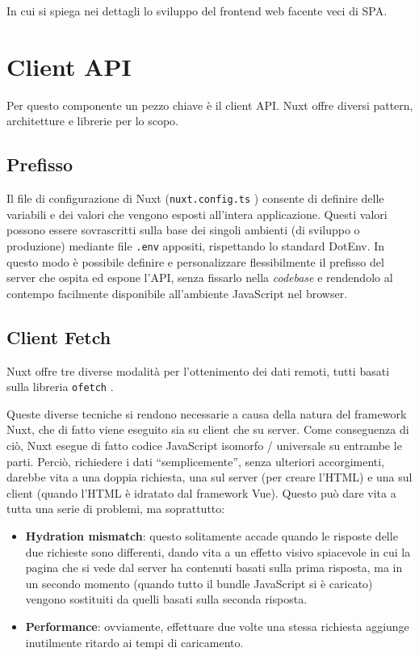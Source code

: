 In cui si spiega nei dettagli lo sviluppo del frontend web facente veci di SPA.

\section{Client API}
Per questo componente un pezzo chiave è il client API. Nuxt offre diversi pattern, architetture e librerie per lo scopo.

\subsection{Prefisso}
Il file di configurazione di Nuxt (\texttt{nuxt.config.ts} \cite{nuxt-config}) consente di definire delle variabili e dei valori che vengono esposti all'intera applicazione.
Questi valori possono essere sovrascritti sulla base dei singoli ambienti (di sviluppo o produzione) mediante file \texttt{.env} appositi, rispettando lo standard DotEnv.
In questo modo è possibile definire e personalizzare flessibilmente il prefisso del server che ospita ed espone l'API, senza fissarlo nella \emph{codebase} e rendendolo al contempo facilmente disponibile all'ambiente JavaScript nel browser.

\subsection{Client Fetch}
Nuxt offre tre diverse modalità per l'ottenimento dei dati remoti, tutti basati sulla libreria \texttt{ofetch} \cite{ofetch}.

Queste diverse tecniche si rendono necessarie a causa della natura del framework Nuxt, che di fatto viene eseguito sia su client che su server. Come conseguenza di ciò, Nuxt esegue di fatto codice JavaScript isomorfo / universale su entrambe le parti. Perciò, richiedere i dati ``semplicemente'', senza ulteriori accorgimenti, darebbe vita a una doppia richiesta, una sul server (per creare l'HTML) e una sul client (quando l'HTML è idratato dal framework Vue). Questo può dare vita a tutta una serie di problemi, ma soprattutto:
\begin{itemize}
    \item \textbf{Hydration mismatch}: questo solitamente accade quando le risposte delle due richieste sono differenti, dando vita a un effetto visivo spiacevole in cui la pagina che si vede dal server ha contenuti basati sulla prima risposta, ma in un secondo momento (quando tutto il bundle JavaScript si è caricato) vengono sostituiti da quelli basati sulla seconda risposta.
    \item \textbf{Performance}: ovviamente, effettuare due volte una stessa richiesta aggiunge inutilmente ritardo ai tempi di caricamento.
\end{itemize}

